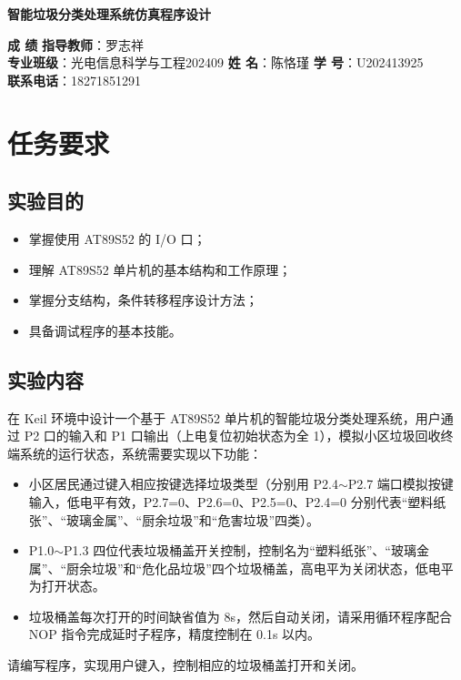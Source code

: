 \documentclass[12pt,a4paper]{article}
\begin{document}
\begin{center}
    \textbf{\small 智能垃圾分类处理系统仿真程序设计}
\end{center}

\noindent
\textbf{成  绩}\hspace{4cm} \textbf{指导教师}：罗志祥 \\
\textbf{专业班级}：光电信息科学与工程202409 \hspace{1cm} \textbf{姓  名}：陈恪瑾 \hspace{1cm} \textbf{学  号}：U202413925 \\
\textbf{联系电话}：18271851291

\section{任务要求}
\subsection{实验目的}
\begin{itemize}
    \item 掌握使用 AT89S52 的 I/O 口；
    \item 理解 AT89S52 单片机的基本结构和工作原理；
    \item 掌握分支结构，条件转移程序设计方法；
    \item 具备调试程序的基本技能。
\end{itemize}

\subsection{实验内容}
在 Keil 环境中设计一个基于 AT89S52 单片机的智能垃圾分类处理系统，用户通过 P2 口的输入和 P1 口输出（上电复位初始状态为全 1），模拟小区垃圾回收终端系统的运行状态，系统需要实现以下功能：
\begin{itemize}
    \item 小区居民通过键入相应按键选择垃圾类型（分别用 P2.4$\sim$P2.7 端口模拟按键输入，低电平有效，P2.7=0、P2.6=0、P2.5=0、P2.4=0 分别代表“塑料纸张”、“玻璃金属”、“厨余垃圾”和“危害垃圾”四类）。
    \item P1.0$\sim$P1.3 四位代表垃圾桶盖开关控制，控制名为“塑料纸张”、“玻璃金属”、“厨余垃圾”和“危化品垃圾”四个垃圾桶盖，高电平为关闭状态，低电平为打开状态。
    \item 垃圾桶盖每次打开的时间缺省值为 8s，然后自动关闭，请采用循环程序配合 NOP 指令完成延时子程序，精度控制在 0.1s 以内。
\end{itemize}
请编写程序，实现用户键入，控制相应的垃圾桶盖打开和关闭。
\end{document}
